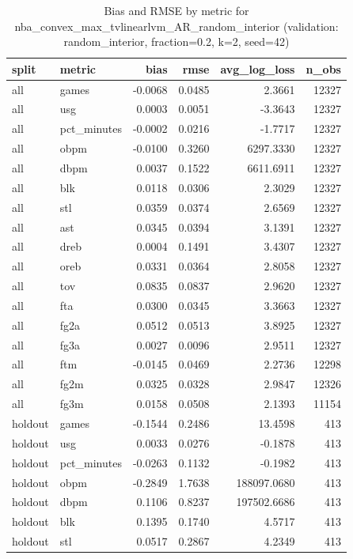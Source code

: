 \begin{table}
\caption{Bias and RMSE by metric for nba_convex_max_tvlinearlvm_AR_random_interior (validation: random_interior, fraction=0.2, k=2, seed=42)}
\label{tab:nba_convex_max_tvlinearlvm_AR_random_interior_vs_random_interior_f20_k2_s42_bias_rmse}
\begin{tabular}{llrrrr}
\toprule
split & metric & bias & rmse & avg\_log\_loss & n\_obs \\
\midrule
all & games & -0.0068 & 0.0485 & 2.3661 & 12327 \\
all & usg & 0.0003 & 0.0051 & -3.3643 & 12327 \\
all & pct\_minutes & -0.0002 & 0.0216 & -1.7717 & 12327 \\
all & obpm & -0.0100 & 0.3260 & 6297.3330 & 12327 \\
all & dbpm & 0.0037 & 0.1522 & 6611.6911 & 12327 \\
all & blk & 0.0118 & 0.0306 & 2.3029 & 12327 \\
all & stl & 0.0359 & 0.0374 & 2.6569 & 12327 \\
all & ast & 0.0345 & 0.0394 & 3.1391 & 12327 \\
all & dreb & 0.0004 & 0.1491 & 3.4307 & 12327 \\
all & oreb & 0.0331 & 0.0364 & 2.8058 & 12327 \\
all & tov & 0.0835 & 0.0837 & 2.9620 & 12327 \\
all & fta & 0.0300 & 0.0345 & 3.3663 & 12327 \\
all & fg2a & 0.0512 & 0.0513 & 3.8925 & 12327 \\
all & fg3a & 0.0027 & 0.0096 & 2.9511 & 12327 \\
all & ftm & -0.0145 & 0.0469 & 2.2736 & 12298 \\
all & fg2m & 0.0325 & 0.0328 & 2.9847 & 12326 \\
all & fg3m & 0.0158 & 0.0508 & 2.1393 & 11154 \\
holdout & games & -0.1544 & 0.2486 & 13.4598 & 413 \\
holdout & usg & 0.0033 & 0.0276 & -0.1878 & 413 \\
holdout & pct\_minutes & -0.0263 & 0.1132 & -0.1982 & 413 \\
holdout & obpm & -0.2849 & 1.7638 & 188097.0680 & 413 \\
holdout & dbpm & 0.1106 & 0.8237 & 197502.6686 & 413 \\
holdout & blk & 0.1395 & 0.1740 & 4.5717 & 413 \\
holdout & stl & 0.0517 & 0.2867 & 4.2349 & 413 \\

\end{tabular}
\end{table}
